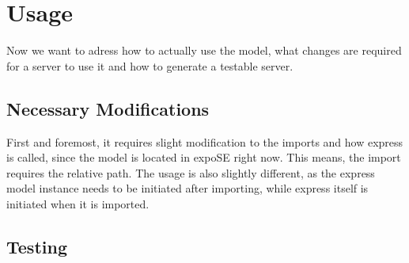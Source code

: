 \section{Usage}
Now we want to adress how to actually use the model, what changes are required for a server to use it and how to generate a testable server.
\subsection{Necessary Modifications}
First and foremost, it requires slight modification to the imports and how express is called, since the model is located in expoSE right now. This means, the import requires the relative path. 
The usage is also slightly different, as the express model instance needs to be initiated after importing, while express itself is initiated when it is imported.
\subsection{Testing}